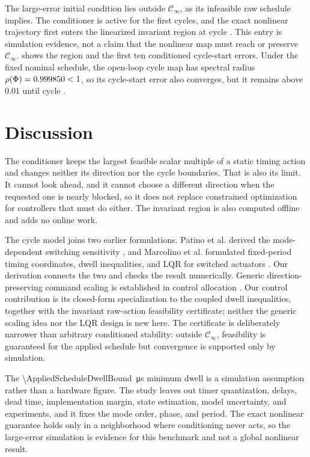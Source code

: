 \documentclass[pdflatex,iicol,sn-mathphys-ay]{sn-jnl}
\begin{document}
The large-error initial condition lies outside $\mathcal C_\infty$, as its infeasible raw schedule implies. The conditioner is active for the first \ConditionedCycleCount{} cycles, and the exact nonlinear trajectory first enters the linearized invariant region at cycle \FirstInvariantRegionCycle{}. This entry is simulation evidence, not a claim that the nonlinear map must reach or preserve $\mathcal C_\infty$.  shows the region and the first ten conditioned cycle-start errors. Under the fixed nominal schedule, the open-loop cycle map has spectral radius $\rho(\Phi)=0.999850{}<1$, so its cycle-start error also converges, but it remains above $0.01$ until cycle \OpenLoopConvergenceCycle{}.




\FloatBarrier
\section{Discussion}

The conditioner keeps the largest feasible scalar multiple of a static timing action and changes neither its direction nor the cycle boundaries. That is also its limit. It cannot look ahead, and it cannot choose a different direction when the requested one is nearly blocked, so it does not replace constrained optimization for controllers that must do either. The invariant region is also computed offline and adds no online work.

The cycle model joins two earlier formulations. Patino et al. derived the mode-dependent switching sensitivity \cite{patino2010}, and Marcolino et al. formulated fixed-period timing coordinates, dwell inequalities, and LQR for switched actuators \cite{marcolino2021}. Our derivation connects the two and checks the result numerically. Generic direction-preserving command scaling is established in control allocation \cite{nakamuraZimmerer2026directionPreserving}. Our control contribution is its closed-form specialization to the coupled dwell inequalities, together with the invariant raw-action feasibility certificate; neither the generic scaling idea nor the LQR design is new here. The certificate is deliberately narrower than arbitrary conditioned stability: outside $\mathcal C_\infty$, feasibility is guaranteed for the applied schedule but convergence is supported only by simulation.

The \SI{\AppliedScheduleDwellBound}{\micro\second} minimum dwell is a simulation assumption rather than a hardware figure. The study leaves out timer quantization, delays, dead time, implementation margin, state estimation, model uncertainty, and experiments, and it fixes the mode order, phase, and period. The exact nonlinear guarantee holds only in a neighborhood where conditioning never acts, so the large-error simulation is evidence for this benchmark and not a global nonlinear result.
\end{document}

